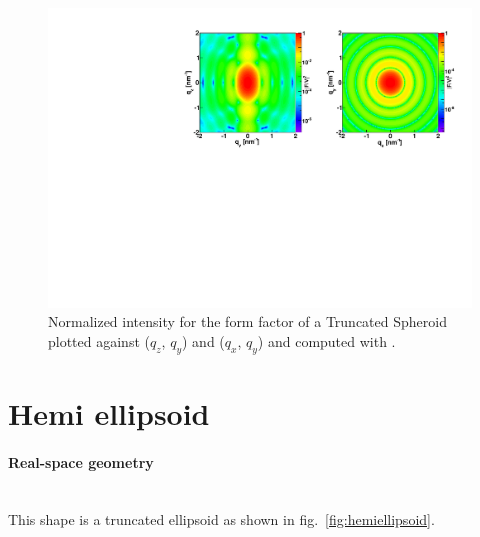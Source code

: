 \begin{figure}[h]
\begin{center}
\includegraphics[width=\textwidth]{Figures/figffspheroid}
\end{center}
\caption{Normalized intensity for the form factor of a Truncated Spheroid plotted against ($q_z$, $q_y$) and ($q_x$, $q_y$) and
  computed with .}
\label{fig:FFspheroidEx}
\end{figure}



\newpage%
\section{Hemi ellipsoid}   

\paragraph{Real-space geometry}\mbox{}\\
This shape is a truncated ellipsoid as shown in fig.~\ref{fig:hemiellipsoid}.

